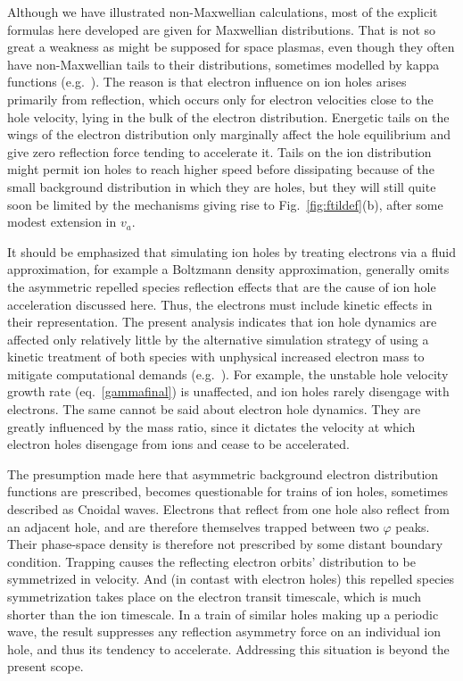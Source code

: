 \documentclass[aip,pop,article-title]{revtex4-2}
\begin{document}
Although we have illustrated non-Maxwellian calculations, most of the
explicit formulas here developed are given for Maxwellian
distributions. That is not so great a weakness as might be supposed
for space plasmas, even though they often have non-Maxwellian tails to
their distributions, sometimes modelled by kappa functions (e.g.\
\cite{Haas2021}). The reason is that electron influence on ion holes
arises primarily from reflection, which occurs only for electron
velocities close to the hole velocity, lying in the bulk of the
electron distribution. Energetic tails on the wings of the electron
distribution only marginally affect the hole equilibrium and give zero
reflection force tending to accelerate it. Tails on the ion
distribution might permit ion holes to reach higher speed before
dissipating because of the small background distribution in which they
are holes, but they will still quite soon be limited by the mechanisms
giving rise to Fig.\ \ref{fig:ftildef}(b), after some modest extension
in $v_a$.

It should be emphasized that simulating ion holes by treating
electrons via a fluid approximation, for example a Boltzmann density
approximation, generally omits the asymmetric repelled species
reflection effects that are the cause of ion hole acceleration
discussed here. Thus, the electrons must include kinetic effects in
their representation. The present analysis indicates that ion hole dynamics
are affected only relatively little by the alternative simulation
strategy of using a kinetic treatment of both species with unphysical
increased electron mass to mitigate computational demands (e.g.\
\cite{Berman1985,Lesur2014}). For example, the unstable hole velocity
growth rate (eq.\ \ref{gammafinal}) is unaffected, and ion holes rarely
disengage with electrons. The same cannot be said about electron hole
dynamics. They are greatly influenced by the mass ratio, since it
dictates the velocity at which electron holes disengage from ions and
cease to be accelerated.

The presumption made here that asymmetric background electron
distribution functions are prescribed, becomes questionable for trains
of ion holes, sometimes described as Cnoidal
waves\cite{Schamel2018}. Electrons that reflect from one hole also
reflect from an adjacent hole, and are therefore themselves trapped
between two $\varphi$ peaks. Their phase-space density is therefore
not prescribed by some distant boundary condition. Trapping causes the
reflecting electron orbits' distribution to be symmetrized  in
velocity. And (in contast with electron holes) this repelled species
symmetrization takes place on the electron transit timescale, which is
much shorter than the ion timescale. In a train of similar holes
making up a periodic wave, the result suppresses any reflection
asymmetry force on an individual ion hole, and thus its tendency to
accelerate. Addressing this situation is beyond the present scope.
\end{document}
